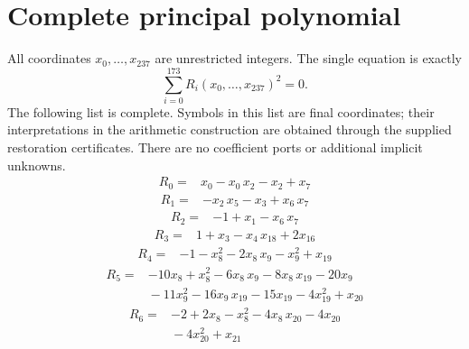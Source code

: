 \documentclass[11pt]{article}
\begin{document}
\section{Complete principal polynomial}\label{app:residuals}
All coordinates \(x_0,\ldots,x_{237}\) are unrestricted integers.
The single equation is exactly
\[
             \sum_{i=0}^{173}R_i(x_0,\ldots,x_{237})^2=0.
\]
The following list is complete. Symbols in this list are final coordinates;
their interpretations in the arithmetic construction are obtained through
the supplied restoration certificates. There are no coefficient ports or
additional implicit unknowns.
\begingroup
\small
\setlength{\abovedisplayskip}{5pt}
\setlength{\belowdisplayskip}{5pt}
\begin{equation*}\begin{aligned}
R_{0}={}&x_{0} - x_{0}\,x_{2} - x_{2} + x_{7}
\end{aligned}\end{equation*}
\begin{equation*}\begin{aligned}
R_{1}={}&-x_{2}\,x_{5} - x_{3} + x_{6}\,x_{7}
\end{aligned}\end{equation*}
\begin{equation*}\begin{aligned}
R_{2}={}&-1 + x_{1} - x_{6}\,x_{7}
\end{aligned}\end{equation*}
\begin{equation*}\begin{aligned}
R_{3}={}&1 + x_{3} - x_{4}\,x_{18} + 2x_{16}
\end{aligned}\end{equation*}
\begin{equation*}\begin{aligned}
R_{4}={}&-1 - x_{8}^{2} - 2x_{8}\,x_{9} - x_{9}^{2} + x_{19}
\end{aligned}\end{equation*}
\begin{equation*}\begin{aligned}
R_{5}={}&-10x_{8} + x_{8}^{2} - 6x_{8}\,x_{9} - 8x_{8}\,x_{19} - 20x_{9} \\
&{} - 11x_{9}^{2} - 16x_{9}\,x_{19} - 15x_{19} - 4x_{19}^{2} + x_{20}
\end{aligned}\end{equation*}
\begin{equation*}\begin{aligned}
R_{6}={}&-2 + 2x_{8} - x_{8}^{2} - 4x_{8}\,x_{20} - 4x_{20} \\
&{} - 4x_{20}^{2} + x_{21}
\end{aligned}\end{equation*}
\end{document}
